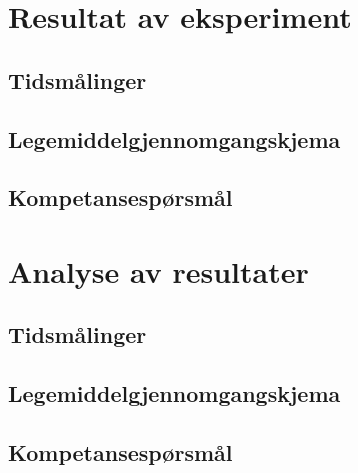 \section{Resultat av eksperiment}
\subsection{Tidsmålinger}
\subsection{Legemiddelgjennomgangskjema}
\subsection{Kompetansespørsmål}

\section{Analyse av resultater}
\label{chap:resanal_analyseavresultater}
\subsection{Tidsmålinger}
\subsection{Legemiddelgjennomgangskjema}
\subsection{Kompetansespørsmål}
